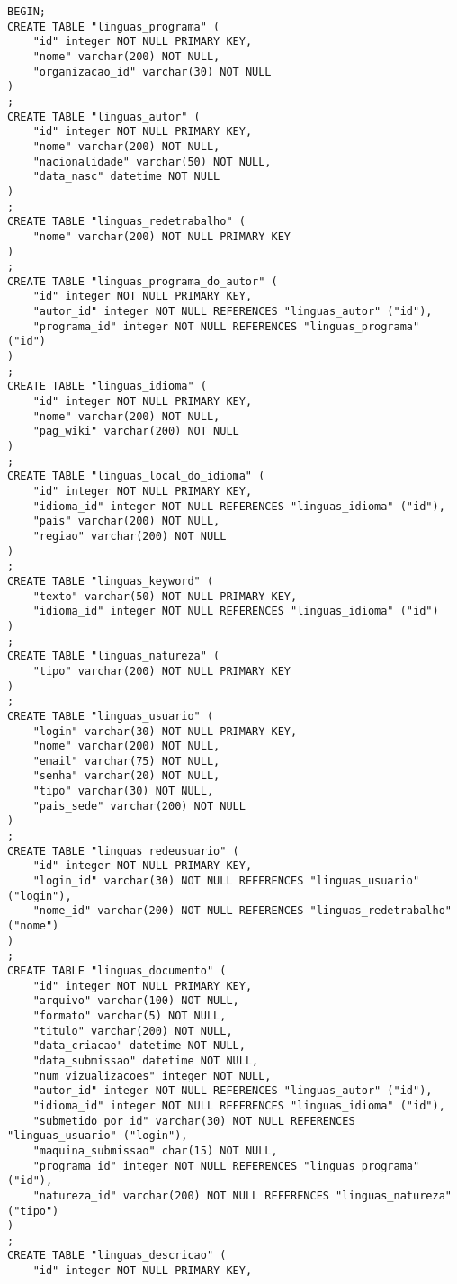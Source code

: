 \documentclass[12pt,a4paper]{article}
\begin{document}
\begin{verbatim}
BEGIN;
CREATE TABLE "linguas_programa" (
    "id" integer NOT NULL PRIMARY KEY,
    "nome" varchar(200) NOT NULL,
    "organizacao_id" varchar(30) NOT NULL
)
;
CREATE TABLE "linguas_autor" (
    "id" integer NOT NULL PRIMARY KEY,
    "nome" varchar(200) NOT NULL,
    "nacionalidade" varchar(50) NOT NULL,
    "data_nasc" datetime NOT NULL
)
;
CREATE TABLE "linguas_redetrabalho" (
    "nome" varchar(200) NOT NULL PRIMARY KEY
)
;
CREATE TABLE "linguas_programa_do_autor" (
    "id" integer NOT NULL PRIMARY KEY,
    "autor_id" integer NOT NULL REFERENCES "linguas_autor" ("id"),
    "programa_id" integer NOT NULL REFERENCES "linguas_programa" ("id")
)
;
CREATE TABLE "linguas_idioma" (
    "id" integer NOT NULL PRIMARY KEY,
    "nome" varchar(200) NOT NULL,
    "pag_wiki" varchar(200) NOT NULL
)
;
CREATE TABLE "linguas_local_do_idioma" (
    "id" integer NOT NULL PRIMARY KEY,
    "idioma_id" integer NOT NULL REFERENCES "linguas_idioma" ("id"),
    "pais" varchar(200) NOT NULL,
    "regiao" varchar(200) NOT NULL
)
;
CREATE TABLE "linguas_keyword" (
    "texto" varchar(50) NOT NULL PRIMARY KEY,
    "idioma_id" integer NOT NULL REFERENCES "linguas_idioma" ("id")
)
;
CREATE TABLE "linguas_natureza" (
    "tipo" varchar(200) NOT NULL PRIMARY KEY
)
;
CREATE TABLE "linguas_usuario" (
    "login" varchar(30) NOT NULL PRIMARY KEY,
    "nome" varchar(200) NOT NULL,
    "email" varchar(75) NOT NULL,
    "senha" varchar(20) NOT NULL,
    "tipo" varchar(30) NOT NULL,
    "pais_sede" varchar(200) NOT NULL
)
;
CREATE TABLE "linguas_redeusuario" (
    "id" integer NOT NULL PRIMARY KEY,
    "login_id" varchar(30) NOT NULL REFERENCES "linguas_usuario" ("login"),
    "nome_id" varchar(200) NOT NULL REFERENCES "linguas_redetrabalho" ("nome")
)
;
CREATE TABLE "linguas_documento" (
    "id" integer NOT NULL PRIMARY KEY,
    "arquivo" varchar(100) NOT NULL,
    "formato" varchar(5) NOT NULL,
    "titulo" varchar(200) NOT NULL,
    "data_criacao" datetime NOT NULL,
    "data_submissao" datetime NOT NULL,
    "num_vizualizacoes" integer NOT NULL,
    "autor_id" integer NOT NULL REFERENCES "linguas_autor" ("id"),
    "idioma_id" integer NOT NULL REFERENCES "linguas_idioma" ("id"),
    "submetido_por_id" varchar(30) NOT NULL REFERENCES "linguas_usuario" ("login"),
    "maquina_submissao" char(15) NOT NULL,
    "programa_id" integer NOT NULL REFERENCES "linguas_programa" ("id"),
    "natureza_id" varchar(200) NOT NULL REFERENCES "linguas_natureza" ("tipo")
)
;
CREATE TABLE "linguas_descricao" (
    "id" integer NOT NULL PRIMARY KEY,

\end{verbatim}
\end{document}
